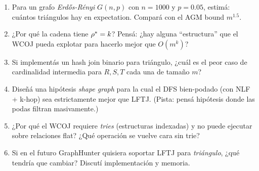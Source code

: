 \begin{ejercicios}
\begin{enumerate}
    \item \starred{} Para un grafo \emph{Erdős-Rényi}
    \(G(n, p)\) con \(n = 1000\) y \(p = 0.05\), estimá: cuántos
    triángulos hay en expectation. Compará con el AGM bound
    \(m^{1.5}\).

    \item ¿Por qué la cadena tiene \(\rho^{*} = k\)? Pensá: ¿hay
    alguna ``estructura'' que el WCOJ pueda explotar para hacerlo
    mejor que \(O(m^k)\)?

    \item \starred{} Si implementás un hash join binario para
    triángulo, ¿cuál es el peor caso de cardinalidad intermedia
    para \(R, S, T\) cada una de tamaño \(m\)?

    \item Diseñá una hipótesis \emph{shape graph} para la cual el
    DFS bien-podado (con NLF + k-hop) sea estrictamente mejor que
    LFTJ. (Pista: pensá hipótesis donde las podas filtran masivamente.)

    \item ¿Por qué el WCOJ requiere \emph{tries} (estructuras
    indexadas) y no puede ejecutar sobre relaciones flat? ¿Qué
    operación se vuelve cara sin trie?

    \item Si en el futuro GraphHunter quisiera soportar LFTJ para
    \emph{triángulo}, ¿qué tendría que cambiar? Discutí
    implementación y memoria.
\end{enumerate}
\end{ejercicios}
